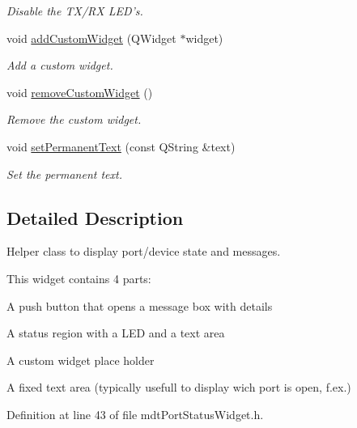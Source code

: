 \begin{DoxyCompactItemize}
\begin{DoxyCompactList}\small\item\em Disable the TX/RX LED's. \end{DoxyCompactList}\item 
void \hyperlink{classmdt_port_status_widget_ac14c1207abd242248538815542cb9068}{addCustomWidget} (QWidget $\ast$widget)
\begin{DoxyCompactList}\small\item\em Add a custom widget. \end{DoxyCompactList}\item 
void \hyperlink{classmdt_port_status_widget_a108227f8f64dd69edd2dcdca2b52b8a0}{removeCustomWidget} ()
\begin{DoxyCompactList}\small\item\em Remove the custom widget. \end{DoxyCompactList}\item 
void \hyperlink{classmdt_port_status_widget_a1b7fd23b45d75ccc106242026f3f8314}{setPermanentText} (const QString \&text)
\begin{DoxyCompactList}\small\item\em Set the permanent text. \end{DoxyCompactList}\end{DoxyCompactItemize}


\subsection{Detailed Description}
Helper class to display port/device state and messages. 

This widget contains 4 parts:
\begin{DoxyItemize}
\item A push button that opens a message box with details
\item A status region with a LED and a text area
\item A custom widget place holder
\item A fixed text area (typically usefull to display wich port is open, f.ex.) 
\end{DoxyItemize}

Definition at line 43 of file mdtPortStatusWidget.h.




